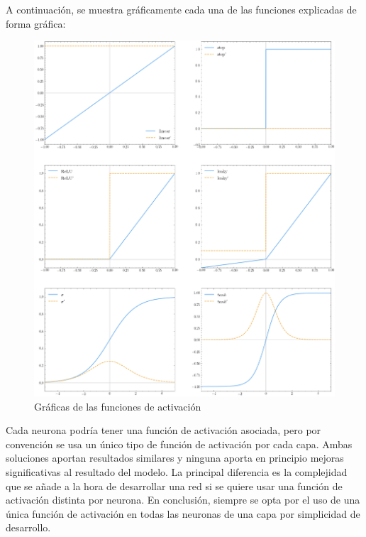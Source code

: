 A continuación, se muestra gráficamente cada una de las funciones explicadas de forma gráfica:
\begin{figure}[H]
    \centering
    \includegraphics[width=15cm]{images/state-of-art/activation-functions/activation_functions.png}
    \caption{Gráficas de las funciones de activación}
    \label{fig:basicneuron}
\end{figure}

Cada neurona podría tener una función de activación asociada, pero por convención se usa un único tipo de función de activación por cada capa. Ambas soluciones aportan resultados similares y ninguna aporta en principio mejoras significativas al resultado del modelo. La principal diferencia es la complejidad que se añade a la hora de desarrollar una red si se quiere usar una función de activación distinta por neurona. En conclusión, siempre se opta por el uso de una única función de activación en todas las neuronas de una capa por simplicidad de desarrollo. 
\newline